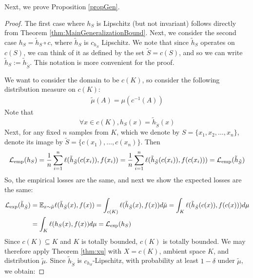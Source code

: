 \documentclass{article}
\begin{document}
Next, we prove Proposition \ref{propGen}.
\generalizationbound*
\begin{proof}
\label{proof_of_three_cases}
The first case where $h_S$ is Lipschitz (but not invariant) follows directly from Theorem \ref{thm:MainGeneralizationBound}.
Next, we  consider the second case $h_S=\tilde{h}_{S}\circ c$, where $\tilde{h}_{S}$ is $c_{h_S}$ Lipschitz. We note that since $\tilde{h}_S$ operates on $c(S)$, we can think of it as defined by the set $\tilde S=c(S) $, and so we can write $\tilde{h}_S:=\tilde{h}_{\tilde S}$. This notation is more convenient for the proof. 

We want to consider the domain to be $c(K)$, so consider the following distribution measure on $c(K)$: 
    \begin{align*}
        \tilde{\mu}(A)= \mu(c^{-1}(A))
    \end{align*}
    Note that $$\forall x \in c(K), h_S(x)=\tilde{h}_{\tilde{S}}(x) $$
    Next, for any fixed $n$ samples from $K$, which we denote by $S=\{x_1,x_2,\ldots,x_n\}$, denote its image by $\tilde S=\{c(x_1),\ldots,c(x_n)\}$.  Then 
    \begin{align*}
        \mathcal{L}_{\mathrm{emp}}(h_S)=\frac{1}{n}\sum_{i=1}^n \ell(\tilde h_{\tilde S}(c(x_i)),f(x_i)) = \frac{1}{n}\sum_{i=1}^n \ell(\tilde h_{\tilde S}(c(x_i)),f(c(x_i))) = \mathcal{L}_{\mathrm{emp}}(\tilde{h}_{\tilde S})
    \end{align*}
    So, the empirical losses are the same, and next we show the expected losses are the same: 
    \begin{align*}
        \mathcal{L}_{\mathrm{exp}}(\tilde{h}_{\tilde S}) &= \mathbb{E}_{x \sim \tilde{\mu}} \ell(\tilde{h}_{\tilde S}(x),f(x)) = \int_{c(K)} \ell(\tilde{h}_{\tilde S}(x),f(x)) d\tilde{\mu} = \int_{K} \ell(\tilde{h}_{\tilde S}(c(x)),f(c(x))) d\mu  \\ 
        &=\int_{K} \ell(h_S(x),f(x)) d\mu = \mathcal{L}_{\mathrm{exp}}(h_S)
    \end{align*}
    Since $c(K)\subseteq K$ and $K$ is totally bounded, $c(K)$ is totally bounded. We may therefore apply Theorem \ref{thm:xu} with $X=c(K)$, ambient space $K$, and distribution $\tilde{\mu}$. Since $\tilde{h}_{\tilde S}$ is $c_{h_S}$-Lipschitz, with probability at least $1-\delta$ under $\tilde{\mu}$, we obtain:


\end{proof}
\end{document}
